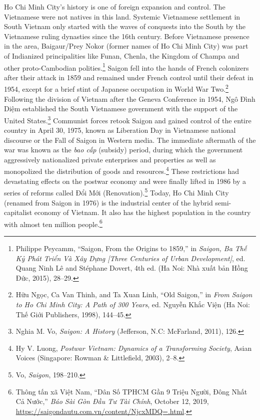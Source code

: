 Ho Chi Minh City's history is one of foreign expansion and control. The Vietnamese were not natives in this land. Systemic Vietnamese settlement in South Vietnam only started with the waves of conquests into the South by the Vietnamese ruling dynasties since the 16th century. Before Vietnamese presence in the area, Baigaur/Prey Nokor (former names of Ho Chi Minh City) was part of Indianized principalities like Funan, Chenla, the Kingdom of Champa and other proto-Cambodian polities.\footnote{Philippe Peycamm, “Saigon, From the Origins to 1859,” in \textit{Saigon, Ba Thế Kỷ Phát Triển Và Xây Dựng [Three Centuries of Urban Development]}, ed. Quang Ninh Lê and Stéphane Dovert, 4th ed. (Ha Noi: Nhà xuất bản Hồng Đức, 2015), 28–29.} Saigon fell into the hands of French colonizers after their attack in 1859 and remained under French control until their defeat in 1954, except for a brief stint of Japanese occupation in World War Two.\footnote{Hữu Ngọc, Ca Van Thinh, and Ta Xuan Linh, “Old Saigon,” in \textit{From Saigon to Ho Chi Minh City: A Path of 300 Years}, ed. Nguyễn Khắc Viện (Ha Noi: Thế Giới Publishers, 1998), 144–45.} Following the division of Vietnam after the Geneva Conference in 1954, Ngô Đình Diệm established the South Vietnamese government with the support of the United States.\footnote{Nghia M. Vo, \textit{Saigon: A History} (Jefferson, N.C: McFarland, 2011), 126.} Communist forces retook Saigon and gained control of the entire country in April 30, 1975, known as Liberation Day in Vietnamese national discourse or the Fall of Saigon in Western media. The immediate aftermath of the war was known as the \textit{bao cấp} (subsidy) period, during which the government aggressively nationalized private enterprises and properties as well as monopolized the distribution of goods and resources.\footnote{Hy V. Luong, \textit{Postwar Vietnam: Dynamics of a Transforming Society}, Asian Voices (Singapore: Rowman \& Littlefield, 2003), 2–8.} These restrictions had devastating effects on the postwar economy and were finally lifted in 1986 by a series of reforms called Đổi Mới (Renovation).\footnote{Vo, \textit{Saigon}, 198–210.} Today, Ho Chi Minh City (renamed from Saigon in 1976) is the industrial center of the hybrid semi-capitalist economy of Vietnam. It also has the highest population in the country with almost ten million people.\footnote{Thông tấn xã Việt Nam, “Dân Số TPHCM Gần 9 Triệu Người, Đông Nhất Cả Nước,” \textit{Báo Sài Gòn Đầu Tư Tài Chính}, October 12, 2019, \url{https://saigondautu.com.vn/content/NjcxMDQ=.html}.}  

